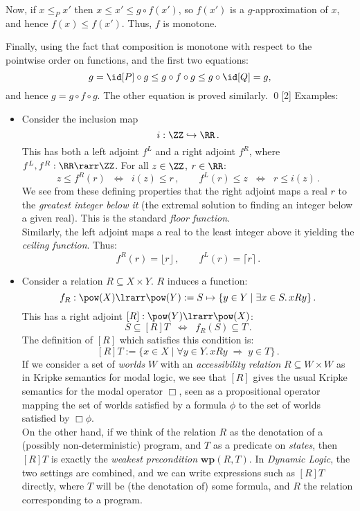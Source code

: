 \documentclass{svmult}
\begin{document}
Now, if $x \leq_{P} x'$ then $x \leq x' \leq g \circ f(x')$, so $f(x')$ is a $g$-approximation of $x$, and hence $f(x) \leq f(x')$. Thus,
$f$ is monotone.

Finally, using the fact that composition is monotone with
respect to the pointwise order on functions, and the first two equations:
\[ g = \id[P] \circ g \leq g \circ f \circ g \leq g \circ \id[Q] = g, \]
and hence $g = g \circ f \circ g$. The other equation is proved similarly. \qed[2]
%
Examples:
\begin{itemize}
\item Consider the inclusion map
\[ i : \ZZ \hookrightarrow \RR\,. \]
This has both a left adjoint $f^{L}$ and a right adjoint $f^{R}$, where $f^{L}, f^{R} : \RR \rarr \ZZ$. For all $z \in \ZZ$, $r \in \RR$:
\[ z \leq f^{R}(r)  \;\; \Longleftrightarrow \;\;  i(z) \leq r \,,\qquad f^{L}(r) \leq z  \;\; \Longleftrightarrow \;\;  r \leq i(z)\,. \]
We see from these defining properties that the right adjoint maps a real $r$ to the \emph{greatest integer below it} (the extremal solution to finding
an integer below a given real). This is the standard \emph{floor function}.\\ Similarly, the left adjoint maps a real to the least integer above it
yielding the \emph{ceiling function}. Thus:
\[ f^{R}(r) = \lfloor r \rfloor\,, \qquad f^{L}(r) = \lceil r \rceil\,. \]
%
\item Consider a relation $R \subseteq  X \times Y$. $R$ induces a function:
\[ f_{R} : \pow(X) \lrarr \pow(Y):= S \mapsto \{ y \in Y \mid \exists x \in S.\, xRy \}\,. \]
This has a right adjoint $[R] : \pow(Y) \lrarr \pow(X)$:
\[ S \subseteq [R]T \;\; \Longleftrightarrow \;\; f_{R}(S) \subseteq T\,. \]
The definition of $[R]$ which satisfies this condition is:
\[ [R]T := \{ x \in X \mid \forall y \in Y. \, xRy \; \Rightarrow \; y \in T \}\,. \]
If we consider a set of \emph{worlds} $W$ with an \emph{accessibility relation} $R \subseteq W \times W$ as in Kripke semantics for modal logic, we see
that $[R]$ gives the usual Kripke semantics for the modal operator $\Box$, seen as a propositional operator mapping the set of worlds satisfied by a
formula $\phi$ to the set of worlds satisfied by $\Box \phi$.
\\
On the other hand, if we think of the relation $R$ as the denotation of a (possibly non-deterministic) program, and $T$ as a predicate on
\emph{states}, then $[R]T$ is exactly the \emph{weakest precondition} $\mathbf{wp}(R, T)$. In \emph{Dynamic Logic}, the two settings are combined, and
we can write expressions such as $[R]T$ directly, where $T$ will be (the denotation of) some formula, and $R$ the relation corresponding to a program.

\end{itemize}
\end{document}
